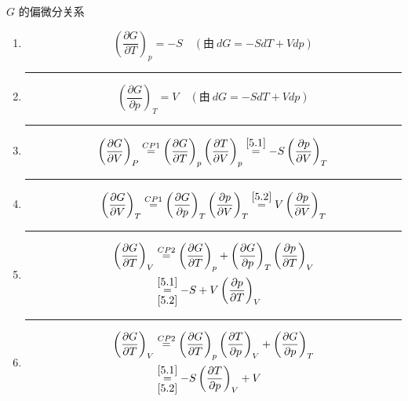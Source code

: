 \begin{example}
    \( G \) 的偏微分关系
    \begin{enumerate}
        \item\label{5.1} \[\left(\frac{\partial G}{\partial T}\right)_p = -S \quad (\text{由} \ dG = -S dT + V dp ) \]
        \hrule
        \item\label{5.2} \[\left(\frac{\partial G}{\partial p}\right)_T = V \quad (\text{由} \ dG = -S dT + V dp ) \]
        \hrule
        \item\label{5.3} \begin{align*}
            \left(\frac{\partial G}{\partial V}\right)_P 
            \overset{CP1}{=} \left(\frac{\partial G}{\partial T}\right)_p 
            \left(\frac{\partial T}{\partial V}\right)_p 
            \overset{\ref*{5.1}}{=} -S \left(\frac{\partial p}{\partial V}\right)_T
        \end{align*} 
        \hrule
        \item\label{5.4} \begin{align*}
            \left(\frac{\partial G}{\partial V}\right)_T 
            \overset{CP1}{=} \left(\frac{\partial G}{\partial p}\right)_T 
            \left(\frac{\partial p}{\partial V}\right)_T 
            \overset{\ref*{5.2}}{=} V \left(\frac{\partial p}{\partial V}\right)_T
        \end{align*}
        \hrule
        \item\label{5.5} \begin{align*}
            \left(\frac{\partial G}{\partial T}\right)_V 
            &\overset{CP2}{=} \left(\frac{\partial G}{\partial T}\right)_p 
            + \left(\frac{\partial G}{\partial p}\right)_T 
            \left(\frac{\partial p}{\partial T}\right)_V \\
            &\overunderset{\ref*{5.1}}{\ref*{5.2}}{=} 
            -S + V \left(\frac{\partial p}{\partial T}\right)_V
        \end{align*}
        \hrule
        \item\label{5.6} \begin{align*}
            \left(\frac{\partial G}{\partial T}\right)_V 
            &\overset{CP2}{=} \left(\frac{\partial G}{\partial T}\right)_p 
            \left(\frac{\partial T}{\partial p}\right)_V
            + \left(\frac{\partial G}{\partial p}\right)_T \\
            &\overunderset{\ref*{5.1}}{\ref*{5.2}}{=} 
            -S\left(\frac{\partial T}{\partial p}\right)_V + V 
        \end{align*}
    \end{enumerate}
\end{example}

















\ifx\allfiles\undefined

\fi
